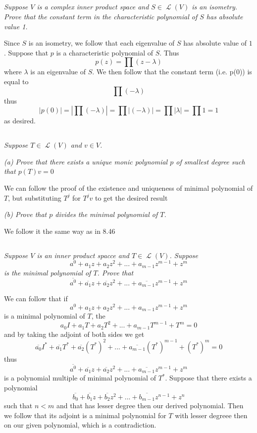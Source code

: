 \documentclass[11pt,oneside,titlepage]{book}
\DeclareMathOperator \map {\mathcal {L}}
\begin{document}
\subsection{}

\textit{Suppose $V$ is a complex inner product space and $S \in \map(V)$ is an isometry.
  Prove that the constant term in the characteristic polynomial
  of $S$ has absolute value 1.}

Since $S$ is an isometry, we follow that each eigenvalue of $S$ has absolute value of $1$.
Suppose that $p$ is a characteristic polynomial of $S$.
Thus
$$p(z) = \prod{(z - \lambda )}$$
where $\lambda$ is an eigenvalue of $S$. We then follow that the constant term (i.e. p(0)) is
equal to
$$\prod{( - \lambda )}$$
thus
$$|p(0)| = |\prod{( - \lambda )}| = \prod{|( - \lambda )|} = \prod{|\lambda|} = \prod{1} = 1$$
as desired.

\subsection{}

\textit{Suppose $T \in \map(V)$ and $v \in V$.}

\textit{(a) Prove that there exists a unique monic polynomial $p$ of smallest
  degree such that $p(T)v = 0$}

We can follow the proof of the existence and uniqueness of minimal polynomial of $T$,
but substituting $T^j$ for $T^jv$ to get the desired result

\textit{(b) Prove that $p$ divides the minimal polynomial of $T$.}

We follow it the same way as in 8.46


\subsection{}

\textit{Suppose $V$ is an inner product spacce and $T \in \map(V)$. Suppose
$$a^0 + a_1z + a_2 z^2 + ... + a_{m - 1}z^{m - 1} + z^m$$
is the minimal polynomial of $T$. Prove that
$$\overline{a^0} + \overline{a_1}z + \overline{a_2} z^2 + ... + \overline{a_{m - 1}}z^{m - 1} + z^m$$}

We can follow that if
$$a^0 + a_1z + a_2 z^2 + ... + a_{m - 1}z^{m - 1} + z^m$$
is a minimal polynomial of $T$, the
$$a_0I + a_1T + a_2 T^2 + ... + a_{m - 1}T^{m - 1} + T^m = 0$$
and by taking the adjoint of both sides we get
$$\overline{a_0}I^* + \overline{a_1}T^* + \overline{a_2} (T^*)^2 + ... +
\overline{a_{m - 1}}(T^*)^{m - 1} + (T^*)^m = 0$$
thus
$$\overline{a^0} + \overline{a_1}z + \overline{a_2} z^2 + ... + \overline{a_{m - 1}}z^{m - 1} + z^m$$
is a polynomial multiple of minimal polynomial of $T^*$. Suppose that there exists a polynomial
$$\overline{b_0} + \overline{b_1}z + \overline{b_2} z^2 + ... + \overline{b_{m - 1}}z^{n - 1} + z^n$$
such that $n < m$ and that has lesser degree then our derived polynomial. Then we follow that
its adjoint is a minimal polynomial for $T$ with lesser degreee then on our given polynomial,
which is a contradiction.
\end{document}
